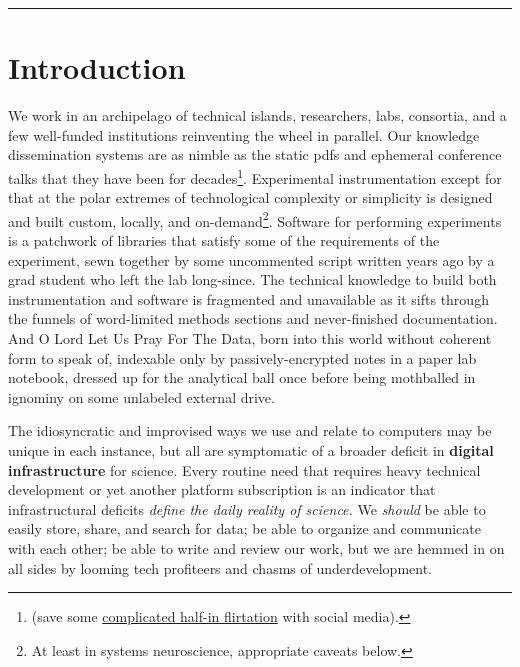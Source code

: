 \documentclass[10pt]{article}
\begin{document}
\begin{center}\rule{0.5\linewidth}{0.5pt}\end{center}

\hypertarget{introduction}{%
\section{Introduction}\label{introduction}}


\begin{multicols}{2}
 We work in an archipelago of technical islands,
researchers, labs, consortia, and a few well-funded institutions
reinventing the wheel in parallel. Our knowledge dissemination systems
are as nimble as the static pdfs and ephemeral conference talks that
they have been for decades\footnote{(save some
  \protect\hyperlink{forums-are-just-one-point-in-a-continuous-feature-space-of-commu}{complicated
  half-in flirtation} with social media).}. Experimental instrumentation
except for that at the polar extremes of technological complexity or
simplicity is designed and built custom, locally, and
on-demand\footnote{At least in systems neuroscience, appropriate caveats
  below.}. Software for performing experiments is a patchwork of
libraries that satisfy some of the requirements of the experiment, sewn
together by some uncommented script written years ago by a grad student
who left the lab long-since. The technical knowledge to build both
instrumentation and software is fragmented and unavailable as it sifts
through the funnels of word-limited methods sections and never-finished
documentation. And O Lord Let Us Pray For The Data, born into this world
without coherent form to speak of, indexable only by passively-encrypted
notes in a paper lab notebook, dressed up for the analytical ball once
before being mothballed in ignominy on some unlabeled external drive.

The idiosyncratic and improvised ways we use and relate to computers may
be unique in each instance, but all are symptomatic of a broader deficit
in \textbf{digital infrastructure} for science. Every routine need that
requires heavy technical development or yet another platform
subscription is an indicator that infrastructural deficits \emph{define
the daily reality of science.} We \emph{should} be able to easily store,
share, and search for data; be able to organize and communicate with
each other; be able to write and review our work, but we are hemmed in
on all sides by looming tech profiteers and chasms of underdevelopment.


\end{multicols}
\end{document}
